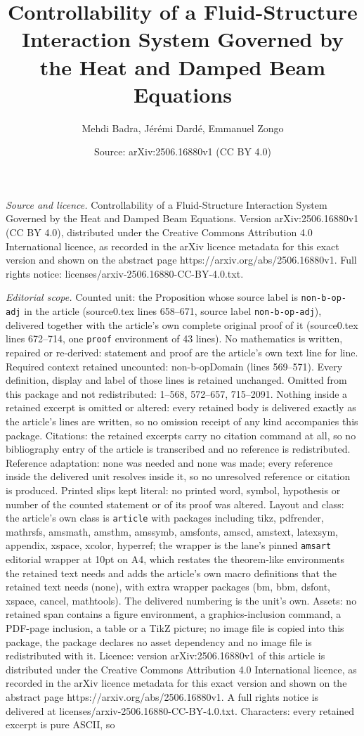 \documentclass[10pt,a4paper]{amsart}
\title[Controllability of a Fluid-Structure Interaction System Gove]{Controllability of a Fluid-Structure Interaction System Governed by the Heat and Damped Beam Equations}
\author{Mehdi Badra, J\'er\'emi Dard\'e, Emmanuel Zongo}
\date{Source: arXiv:2506.16880v1 (CC BY 4.0)}
\begin{document}
\maketitle

\noindent\emph{Source and licence.} Controllability of a Fluid-Structure Interaction System Governed by the Heat and Damped Beam Equations. Version arXiv:2506.16880v1 (CC BY 4.0), distributed under the Creative Commons Attribution 4.0 International licence, as recorded in the arXiv licence metadata for this exact version and shown on the abstract page https://arxiv.org/abs/2506.16880v1. Full rights notice: licenses/arxiv-2506.16880-CC-BY-4.0.txt.\par\smallskip

\noindent\textit{Editorial scope.} Counted unit: the Proposition whose source label is \texttt{non-b-op-adj} in the article (source0.tex lines 658--671, source label \texttt{non-b-op-adj}), delivered together with the article's own complete original proof of it (source0.tex lines 672--714, one \texttt{proof} environment of 43 lines). No mathematics is written, repaired or re-derived: statement and proof are the article's own text line for line. Required context retained uncounted: non-b-opDomain (lines 569--571). Every definition, display and label of those lines is retained unchanged. Omitted from this package and not redistributed: 1--568, 572--657, 715--2091. Nothing inside a retained excerpt is omitted or altered: every retained body is delivered exactly as the article's lines are written, so no omission receipt of any kind accompanies this package. Citations: the retained excerpts carry no citation command at all, so no bibliography entry of the article is transcribed and no reference is redistributed. Reference adaptation: none was needed and none was made; every reference inside the delivered unit resolves inside it, so no unresolved reference or citation is produced. Printed slips kept literal: no printed word, symbol, hypothesis or number of the counted statement or of its proof was altered. Layout and class: the article's own class is \texttt{article} with packages including tikz, pdfrender, mathrsfs, amsmath, amsthm, amssymb, amsfonts, amscd, amstext, latexsym, appendix, xspace, xcolor, hyperref; the wrapper is the lane's pinned \texttt{amsart} editorial wrapper at 10pt on A4, which restates the theorem-like environments the retained text needs and adds the article's own macro definitions that the retained text needs (none), with extra wrapper packages (bm, bbm, dsfont, xspace, cancel, mathtools). The delivered numbering is the unit's own. Assets: no retained span contains a figure environment, a graphics-inclusion command, a PDF-page inclusion, a table or a TikZ picture; no image file is copied into this package, the package declares no asset dependency and no image file is redistributed with it. Licence: version arXiv:2506.16880v1 of this article is distributed under the Creative Commons Attribution 4.0 International licence, as recorded in the arXiv licence metadata for this exact version and shown on the abstract page https://arxiv.org/abs/2506.16880v1. A full rights notice is delivered at licenses/arxiv-2506.16880-CC-BY-4.0.txt. Characters: every retained excerpt is pure ASCII, so 
\end{document}
